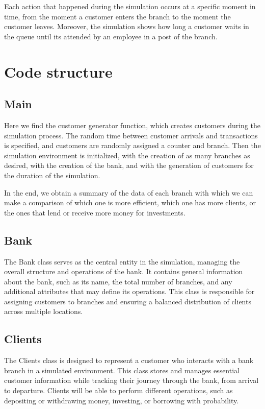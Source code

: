 \documentclass[titlepage, 12pt]{article}
\begin{document}
Each action that happened during the simulation occurs at a specific moment in time, from the moment a customer enters the branch to the moment the customer leaves. Moreover, the simulation shows how long a customer waits in the queue until its attended by an employee in a post of the branch.

\newpage

\section{Code structure}

\subsection{Main}
Here we find the customer generator function, which creates customers during the simulation process. The random time between customer arrivals and transactions is specified, and customers are randomly assigned a counter and branch. Then the simulation environment is initialized, with the creation of as many branches as desired, with the creation of the bank, and with the generation of customers for the duration of the simulation. 

In the end, we obtain a summary of the data of each branch with which we can make a comparison of which one is more efficient, which one has more clients, or the ones that lend or receive more money for investments.

\subsection{Bank}
The Bank class serves as the central entity in the simulation, managing the overall structure and operations of the bank. It contains general information about the bank, such as its name, the total number of branches, and any additional attributes that may define its operations. This class is responsible for assigning customers to branches and ensuring a balanced distribution of clients across multiple locations.

\subsection{Clients}
The Clients class is designed to represent a customer who interacts with a bank branch in a simulated environment. This class stores and manages essential customer information while tracking their journey through the bank, from arrival to departure. Clients will be able to perform different operations, such as depositing or withdrawing money, investing, or borrowing with probability. 
\end{document}
